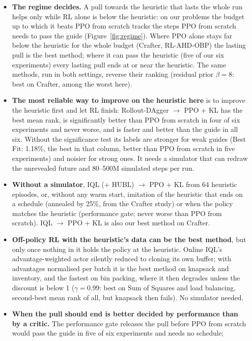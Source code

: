 \documentclass[11pt,a4paper]{article}
\begin{document}
\begin{itemize}[leftmargin=*]
\item \textbf{The regime decides.} A pull towards the heuristic that lasts the whole run helps only while RL alone is
  below the heuristic: on our problems the budget up to which it beats PPO from scratch tracks the steps PPO from
  scratch needs to pass the guide (Figure~\ref{fig:regime}). Where PPO alone stays far below the heuristic for the
  whole budget (Crafter, RL-AHD-OBP) the lasting pull is the best method; where it can pass the heuristic (five of
  our six experiments) every lasting pull ends at or near the heuristic. The same methods, run in both settings,
  reverse their ranking (residual prior $\beta = 8$: best on Crafter, among the worst here).
\item \textbf{The most reliable way to improve on the heuristic here} is to improve the heuristic first and let RL
  finish: Rollout-DAgger $\to$ PPO + KL has the best mean rank, is significantly better than PPO from scratch in four
  of six experiments and never worse, and is faster and better than the guide in all six. Without the significance
  test its labels are stronger for weak guides (Best Fit: 1.18\%, the best in that column, better than PPO from
  scratch in five experiments) and noisier for strong ones. It needs a simulator that can redraw the unrevealed future
  and 80--500M simulated steps per run.
\item \textbf{Without a simulator}, IQL (+ HUBL) $\to$ PPO + KL from 64 heuristic episodes, or, without any warm
  start, imitation of the heuristic that ends on a schedule (annealed by 25\%, from the Crafter study) or when the
  policy matches the heuristic (performance gate; never worse than PPO from scratch). IQL $\to$ PPO + KL is also our
  best method on Crafter.
\item \textbf{Off-policy RL with the heuristic's data can be the best method}, but only once nothing in it holds the
  policy at the heuristic. Online IQL's advantage-weighted actor silently reduced to cloning its own buffer; with
  advantages normalised per batch it is the best method on knapsack and inventory, and the fastest on
  bin packing, where it then degrades unless the discount is below 1 ($\gamma = 0.99$: best on Sum of Squares and load
  balancing, second-best mean rank of all, but knapsack then fails). No simulator needed.
\item \textbf{When the pull should end is better decided by performance than by a critic.} The performance gate
  releases the pull before PPO from scratch would pass the guide in five of six experiments and needs no schedule;

\end{itemize}
\end{document}
